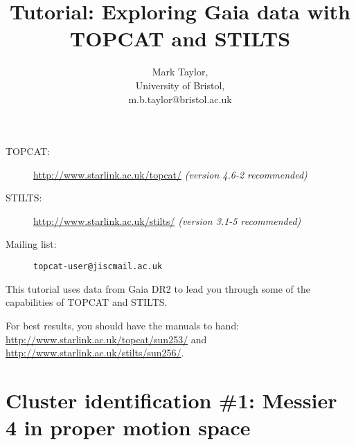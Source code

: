 \documentclass{article}
\newcommand{\turl}[1]{{\color{blue}\url{#1}}}
\begin{document}
\raggedright

\title{Tutorial: Exploring Gaia data with TOPCAT and STILTS}
\author{Mark Taylor,\\
        University of Bristol,\\
        m.b.taylor@bristol.ac.uk}
\date{\vspace*{-4ex}}  %

\maketitle

\begin{description}
  \item[TOPCAT:] \turl{http://www.starlink.ac.uk/topcat/}
                 {\em (version 4.6-2 recommended)}
  \item[STILTS:] \turl{http://www.starlink.ac.uk/stilts/}
                 {\em (version 3.1-5 recommended)}
  \item[Mailing list:] {\tt topcat-user@jiscmail.ac.uk}
\end{description}
\tableofcontents

\vspace*{2cm}
\begin{center}
  \color{grey}
  {\tt }
\end{center}

\newpage

This tutorial uses data from Gaia DR2 \cite{dr2} to lead you
through some of the capabilities of TOPCAT and STILTS.

For best results, you should have the manuals to hand:
\url{http://www.starlink.ac.uk/topcat/sun253/} and
\url{http://www.starlink.ac.uk/stilts/sun256/}.

\section{Cluster identification \#1: Messier 4 in proper motion space}
\end{document}
